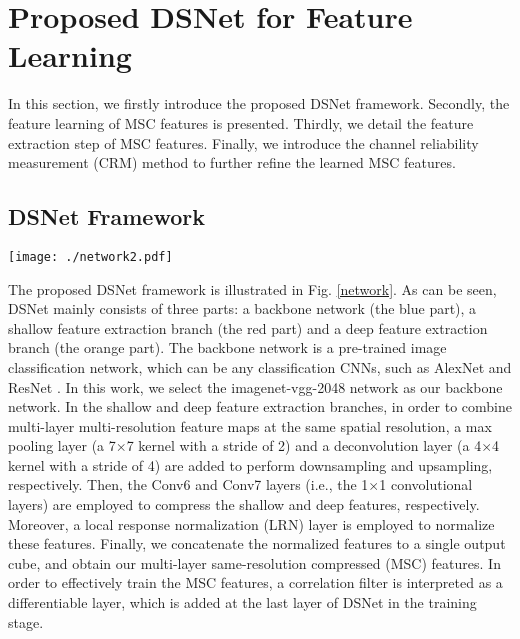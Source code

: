 \documentclass[runningheads]{llncs}
\begin{document}
\section{Proposed DSNet for Feature Learning}
In this section, we firstly introduce the proposed DSNet framework. Secondly, the feature learning of MSC features is presented. Thirdly, we detail the feature extraction step of MSC features. Finally, we introduce the  channel reliability measurement (CRM) method to further refine the learned MSC features.


\subsection{DSNet Framework} %
\begin{figure*}[!tp]
\begin{center}
   \texttt{[image: ./network2.pdf]} %
\end{center}
 \caption{Overall architecture of the proposed deep and shallow feature learning network (DSNet).}
\label{network}
\end{figure*}


The proposed DSNet framework is illustrated in Fig. \ref{network}. As can be seen, DSNet mainly consists of three parts: a backbone network (the blue part), a shallow feature extraction branch (the red part) and a deep feature extraction branch (the orange part). The backbone network is a pre-trained image classification network, which can be any classification CNNs, such as AlexNet \cite{Alexnet} and ResNet \cite{Resnet}. In this work, we select the imagenet-vgg-2048 network \cite{VGG-M} as our backbone network. In the shallow and deep feature extraction branches, in order to combine multi-layer multi-resolution feature maps at the same spatial resolution, a max pooling layer (a 7$\times$7 kernel with a stride of 2) and a deconvolution layer \cite{Deconv} (a 4$\times$4 kernel with a stride of 4) are added to perform downsampling and upsampling, respectively. Then, the Conv6 and Conv7 layers (i.e., the 1$\times$1 convolutional layers) are employed to compress the shallow and deep features, respectively. Moreover, a local response normalization (LRN) layer \cite{Alexnet}  is employed to normalize these features. Finally, we concatenate the normalized features to a single output cube, and obtain our multi-layer same-resolution compressed (MSC) features. In order to effectively train the MSC features, a correlation filter is interpreted as a differentiable layer, which is added at the last layer of DSNet in the training stage.
 
\end{document}

